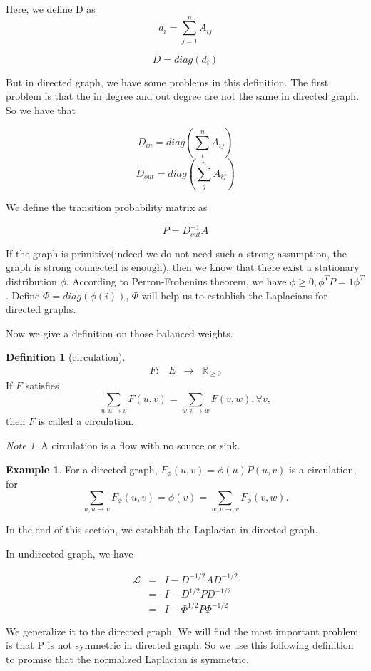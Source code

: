 \documentclass[twoside]{article}
\theoremstyle{definition}
\newenvironment{map}{\[\begin{array}{cccc}} {\end{array}\]}
\theoremstyle{definition}
\newtheorem*{defn}{Definition}
\newtheorem*{exmp}{Example}
\theoremstyle{remark}
\newtheorem*{note}{Note}
\def\R{{\mathbb R}}
\def\L{{\mathcal L}}
\begin{document}
Here, we define D as $$d_i=\sum_{j=1}^{n}A_{ij}$$

$$D=diag(d_i)$$

But in directed graph, we have some problems in this definition.  The first problem is that the in degree and out degree are not the same in directed graph.  So we have that

$$D_{in}=diag(\sum_{i}^{n}A_{ij})$$
$$D_{out}=diag(\sum_{j}^{n}A_{ij})$$

We define the transition probability matrix as

$$P=D_{out}^{-1} A$$

If the graph is primitive(indeed we do not need such a strong assumption, the graph is strong connected is enough), then we know that there exist a stationary distribution $\phi$.  According to Perron-Frobenius theorem, we have $\phi \geq 0, \phi^T P =1 \phi ^T$.  Define $\Phi=diag(\phi(i))$, $\Phi$ will help us to establish the Laplacians for directed graphs.

Now we give a definition on those balanced weights.
  \begin{defn}[circulation]
  \begin{map}
  F: & E & \rightarrow & \R_{\geq 0}
  \end{map}
  If $F$ satisfies
  \[\sum_{u,u\rightarrow v} F(u,v)=\sum_{w,v\rightarrow w} F(v,w),\forall v,\]
  then $F$ is called a circulation.
  \end{defn}
  \begin{note}
  A circulation is a flow with no source or sink.
  \end{note}

  \begin{exmp}
  For a directed graph, $F_\phi(u,v)=\phi(u)P(u,v)$ is a circulation, for
  \[\sum_{u,u\rightarrow v} F_\phi(u,v)=\phi(v)=\sum_{w,v\rightarrow w} F_\phi(v,w).\]
  \end{exmp}

In the end of this section, we establish the Laplacian in directed graph.

In undirected graph, we have

  \begin{eqnarray*}
   \L &=& I-D^{-1/2}AD^{-1/2} \\
      &=& I-D^{1/2}PD^{-1/2} \\
      &=& I-\Phi^{1/2}P\Phi^{-1/2} 
  \end{eqnarray*}

  We generalize it to the directed graph.  We will find the most important problem is that P is not symmetric in directed graph.  So we use this following definition to promise that the normalized Laplacian is symmetric.
\end{document}
